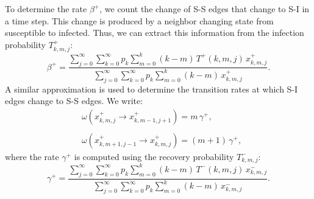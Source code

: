 To determine the rate $\beta^{+}$, we count the change of S-S edges that change to S-I in a time step. This change is produced by a neighbor changing state from susceptible to infected. Thus, we can extract this information from the infection probability $T^{+}_{k,m,j} $:
\begin{equation}
        \label{beta_s}
        \beta^{+} = \frac{\sum_{j=0}^{\infty} \sum_{k=0}^{\infty} p_k \sum_{m = 0}^{k} (k - m)\, T^{+} (k,m,j) \, x^{+}_{k,m,j}}{\sum_{j=0}^{\infty} \sum_{k=0}^{\infty} p_k \sum_{m = 0}^{k} (k - m) \, x^{+}_{k,m,j}}.
\end{equation}
A similar approximation is used to determine the transition rates at which S-I edges change to S-S edges. We write:
\begin{align} \label{rate_gamma_s}
    &  \omega (x^{+}_{k,m,j} \to x^{+}_{k,m-1,j+1}) = m\, \gamma^{+}, \nonumber \\
    \\
    & \omega (x^{+}_{k,m+1,j-1} \to x^{+}_{k,m,j}) = (m + 1)\, \gamma^{+} , \nonumber
\end{align}
where the rate $\gamma^{+}$ is computed using the recovery probability $T^{-}_{k,m,j}$:
\begin{equation}
        \label{gamma_s}
        \gamma^{+} = \frac{\sum_{j=0}^{\infty} \sum_{k=0}^{\infty} p_k \sum_{m = 0}^{k} (k - m)\, T^{-} (k,m,j) \, x^{-}_{k,m,j}}{\sum_{j=0}^{\infty} \sum_{k=0}^{\infty} p_k \sum_{m = 0}^{k} (k - m)\,  x^{-}_{k,m,j}}.
\end{equation}
    
